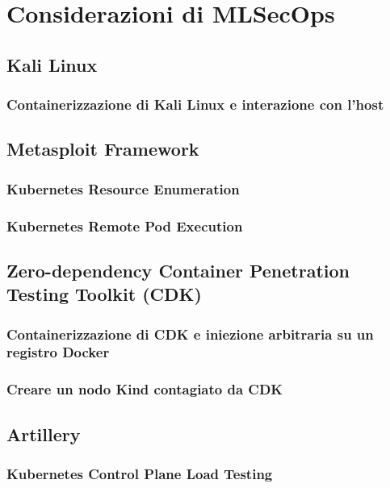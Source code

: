 % 
% 
% 



\clearpage
\cleardoublepage

\chapter{Considerazioni di MLSecOps}

\section{Kali Linux}

\subsection{Containerizzazione di Kali Linux e interazione con l'host}

\section{Metasploit Framework}

\subsection{Kubernetes Resource Enumeration}

\subsection{Kubernetes Remote Pod Execution}

\section{Zero-dependency Container Penetration Testing Toolkit (CDK)}

\subsection{Containerizzazione di CDK e iniezione arbitraria su un registro Docker}

\subsection{Creare un nodo Kind contagiato da CDK}

\section{Artillery}

\subsection{Kubernetes Control Plane Load Testing}
